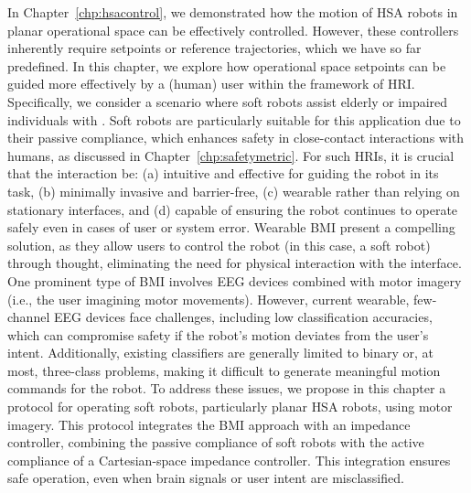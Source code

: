 \begin{foreword}
    In Chapter~\ref{chp:hsacontrol}, we demonstrated how the motion of \gls{HSA} robots in planar operational space can be effectively controlled. However, these controllers inherently require setpoints or reference trajectories, which we have so far predefined. In this chapter, we explore how operational space setpoints can be guided more effectively by a (human) user within the framework of \gls{HRI}. Specifically, we consider a scenario where soft robots assist elderly or impaired individuals with . Soft robots are particularly suitable for this application due to their passive compliance, which enhances safety in close-contact interactions with humans, as discussed in Chapter~\ref{chp:safetymetric}.
    For such \glspl{HRI}, it is crucial that the interaction be: (a) intuitive and effective for guiding the robot in its task, (b) minimally invasive and barrier-free, (c) wearable rather than relying on stationary interfaces, and (d) capable of ensuring the robot continues to operate safely even in cases of user or system error. Wearable \gls{BMI} present a compelling solution, as they allow users to control the robot (in this case, a soft robot) through thought, eliminating the need for physical interaction with the interface. One prominent type of \gls{BMI} involves \gls{EEG} devices combined with motor imagery (i.e., the user imagining motor movements).
    However, current wearable, few-channel \gls{EEG} devices face challenges, including low classification accuracies, which can compromise safety if the robot’s motion deviates from the user’s intent. Additionally, existing classifiers are generally limited to binary or, at most, three-class problems, making it difficult to generate meaningful motion commands for the robot.
    To address these issues, we propose in this chapter a protocol for operating soft robots, particularly planar \gls{HSA} robots, using motor imagery. This protocol integrates the \gls{BMI} approach with an impedance controller, combining the passive compliance of soft robots with the active compliance of a Cartesian-space impedance controller. This integration ensures safe operation, even when brain signals or user intent are misclassified.
\end{foreword}

\pagebreak

